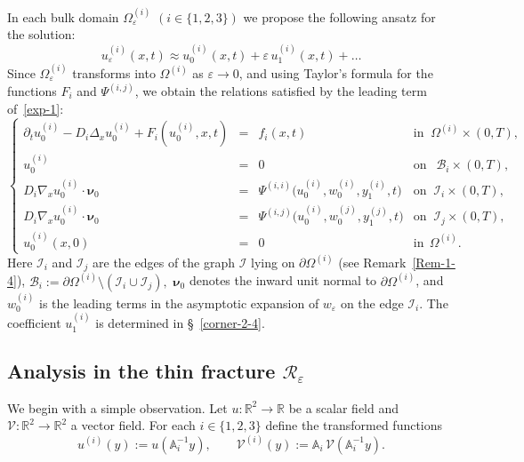 \documentclass[reqno]{amsart}            %
\numberwithin{equation}{section}
\begin{document}
	In each bulk domain $\Omega_\varepsilon^{(i)}$ $(i\in\{1,2,3\})$ we propose the following ansatz for the solution:
	\begin{equation}\label{exp-1}
		u^{(i)}_\varepsilon(x,t)
		\approx u^{(i)}_0(x,t) + \varepsilon\,u^{(i)}_1(x,t) + \ldots
	\end{equation}
	Since $\Omega_\varepsilon^{(i)}$ transforms into $\Omega^{(i)}$ as $\varepsilon\to0$, and using Taylor’s formula for the functions $F_i$ and $\Psi^{(i,j)}$, we obtain the relations satisfied by the leading term of~\eqref{exp-1}:
	\begin{equation}\label{relations+}
		\left\{
		\begin{array}{rcll}
			\partial_t u^{(i)}_0 - D_i \Delta_x u^{(i)}_0
			+ F_i(u^{(i)}_0,x,t) &=& f_i(x,t)
			& \text{in }\ \Omega^{(i)}\times(0,T),
			\\[2mm]
			u^{(i)}_0 &=& 0
			& \text{on } \ \ \mathcal{B}_i\times(0,T),
			\\[2mm]
			D_i\nabla_x u^{(i)}_0\cdot\boldsymbol{\nu}_0
			&=& \Psi^{(i,i)}\big(u^{(i)}_0,w^{(i)}_0,y^{(i)}_1,t\big)
			& \text{on } \ \mathcal{I}_i\times(0,T),
			\\[2mm]
			D_i\nabla_x u^{(i)}_0\cdot\boldsymbol{\nu}_0
			&=& \Psi^{(i,j)}\big(u^{(i)}_0,w^{(j)}_0,y^{(j)}_1,t\big)
			& \text{on } \ \mathcal{I}_j\times(0,T),
			\\[2mm]
			u^{(i)}_0(x,0) &=& 0 & \text{in} \ \ \Omega^{(i)}.
		\end{array}
		\right.
	\end{equation}
	Here $\mathcal{I}_i$ and $\mathcal{I}_j$ are the edges of the graph
	$\mathcal{I}$ lying on $\partial\Omega^{(i)}$ (see Remark~\ref{Rem-1-4}), 
	$\mathcal{B}_i := \partial\Omega^{(i)}\setminus(\mathcal{I}_i\cup\mathcal{I}_j),$ 
	$\boldsymbol{\nu}_0$ denotes
	the inward unit normal to $\partial\Omega^{(i)}$, and $w^{(i)}_0$ is the leading terms in the asymptotic expansion of
	$w_\varepsilon$ on the edge $\mathcal{I}_i.$ The coefficient $u^{(i)}_1$ is determined in \S~\ref{corner-2-4}.
	
	
	\subsection{Analysis in the thin fracture $\mathcal{R}_\varepsilon$}\label{Par-3-1}
	
	We begin with a simple observation.  
	Let \(u:\mathbb{R}^2\to\mathbb{R}\) be a scalar field and
	\(\bm{\mathcal V}:\mathbb{R}^2\to\mathbb{R}^2\) a vector field.  
	For each \(i\in\{1,2,3\}\) define the transformed functions
	\[
	u^{(i)}(y):=u(\mathbb{A}_i^{-1}y),\qquad
	\bm{\mathcal V}^{(i)}(y):=\mathbb{A}_i\,\bm{\mathcal V}(\mathbb{A}_i^{-1}y).
	\]
	
\end{document}

